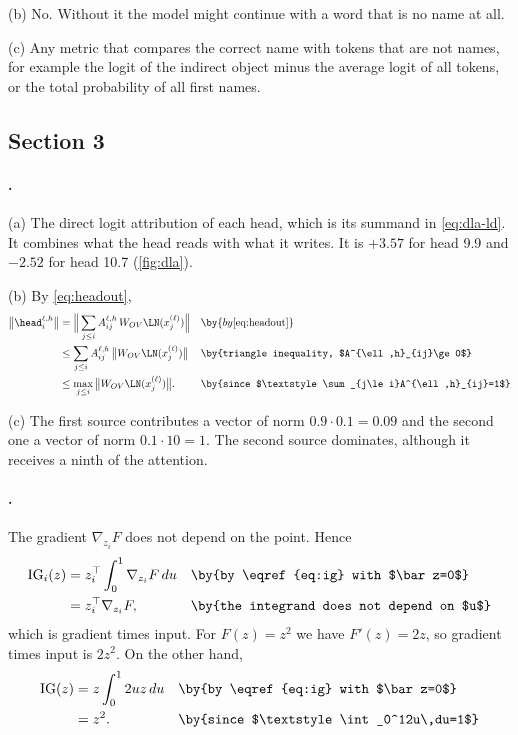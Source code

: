 {(b) No. Without it the model might continue with a word that is no name at all.

(c) Any metric that compares the correct name with tokens that are not names, for example the logit of the
indirect object minus the average logit of all tokens, or the total probability of all first names.

\subsection*{Section 3}

\paragraph{.}
(a) The direct logit attribution of each head, which is its summand in \eqref{eq:dla-ld}. It combines what the head
reads with what it writes. It is $+3.57$ for head 9.9 and $-2.52$ for head 10.7 (\cref{fig:dla}).

(b) By \eqref{eq:headout},
\begin{align*}
\big\|\head_i^{\ell,h}\big\| &= \Big\|\sum_{j\le i}A^{\ell,h}_{ij}\,W_{OV}\LN(x_j^{(\ell)})\Big\| && \by{by \eqref{eq:headout}}\\
&\le \sum_{j\le i}A^{\ell,h}_{ij}\,\big\|W_{OV}\LN(x_j^{(\ell)})\big\| && \by{triangle inequality, $A^{\ell,h}_{ij}\ge0$}\\
&\le \max_{j\le i}\big\|W_{OV}\LN(x_j^{(\ell)})\big\|. && \by{since $\textstyle\sum_{j\le i}A^{\ell,h}_{ij}=1$}
\end{align*}

(c) The first source contributes a vector of norm $0.9\cdot0.1=0.09$ and the second one a vector of norm
$0.1\cdot10=1$. The second source dominates, although it receives a ninth of the attention.

\paragraph{.}
The gradient $\nabla_{z_i}F$ does not depend on the point. Hence
\begin{align*}
\mathrm{IG}_i(z) &= z_i^\top\int_0^1\nabla_{z_i}F\,du && \by{by \eqref{eq:ig} with $\bar z=0$}\\
&= z_i^\top\nabla_{z_i}F, && \by{the integrand does not depend on $u$}
\end{align*}
which is gradient times input. For $F(z)=z^2$ we have $F'(z)=2z$, so gradient times input is $2z^2$. On the other
hand,
\begin{align*}
\mathrm{IG}(z) &= z\int_0^12uz\,du && \by{by \eqref{eq:ig} with $\bar z=0$}\\
&= z^2. && \by{since $\textstyle\int_0^12u\,du=1$}
\end{align*}

}
